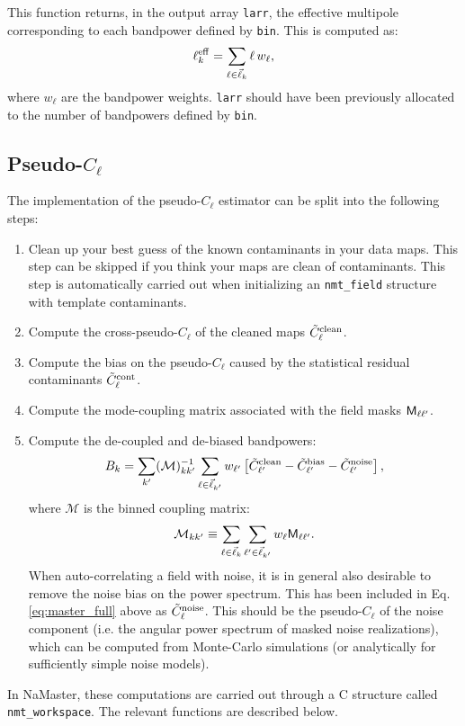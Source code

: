 \documentclass[a4paper,10pt]{article}
\newcommand{\vari}[2]{\textcolor{OliveGreen}{#1}{#2}}
\newcommand{\functi}[3]{{\tt\textcolor{OliveGreen}{#1}
    \textcolor{blue}{#2}(#3)}}
\newenvironment{funcdef}[2][void main(void)]
{\vspace{12pt}\par\noindent{\large{\bf #1}}\vspace{5pt}
 \par\noindent\leftskip=20pt{{#2}}\vspace{5pt}
 \par\noindent\leftskip=5pt\rightskip=5pt}
{\par\leftskip=0pt\rightskip=0pt\vspace{12pt}}
\begin{document}
\begin{funcdef}[nmt\_ell\_eff]
 {\functi{void}{nmt\_ell\_eff}{\vari{nmt\_binning\_scheme *}{bin},\vari{double *}{larr}}}
 This function returns, in the output array {\tt larr}, the effective multipole corresponding to each bandpower defined by {\tt bin}. This is computed as:
 \begin{equation}
   \ell^{\rm eff}_k=\sum_{\ell\in\vec{\ell}_k}\ell\,w_\ell,
 \end{equation}
 where $w_\ell$ are the bandpower weights. {\tt larr} should have been previously allocated to the number of bandpowers defined by {\tt bin}.
\end{funcdef}

\subsection{Pseudo-$C_\ell$}
The implementation of the pseudo-$C_\ell$ estimator can be split into the following steps:
\begin{enumerate}
  \item Clean up your best guess of the known contaminants in your data maps. This step can be skipped if you think your maps are clean of contaminants. This step is automatically carried out when initializing an {\tt nmt\_field} structure with template contaminants.
  \item Compute the cross-pseudo-$C_\ell$ of the cleaned maps $\tilde{C}^{\rm clean}_\ell$.
  \item Compute the bias on the pseudo-$C_\ell$ caused by the statistical residual contaminants $\tilde{C}^{\rm cont}_\ell$.
  \item Compute the mode-coupling matrix associated with the field masks ${\sf M}_{\ell\ell'}$.
  \item Compute the de-coupled and de-biased bandpowers:
        \begin{equation}\label{eq:master_full}
          B_k=\sum_{k'}(\mathcal{M})^{-1}_{kk'}\sum_{\ell\in\vec{\ell}_{k'}}w_{\ell'}\left[\tilde{C}^{\rm clean}_{\ell'}-\tilde{C}^{\rm bias}_{\ell'}-\tilde{C}^{\rm noise}_{\ell'}\right],
        \end{equation}
        where $\mathcal{M}$ is the binned coupling matrix:
        \begin{equation}
          \mathcal{M}_{kk'}\equiv\sum_{\ell\in\vec{\ell}_k}\sum_{\ell'\in\vec{\ell}_{k'}}w_\ell{\sf M}_{\ell\ell'}.
        \end{equation}
        When auto-correlating a field with noise, it is in general also desirable to remove the noise bias on the power spectrum. This has been included in Eq. \ref{eq:master_full} above as $\tilde{C}^{\rm noise}_\ell$. This should be the pseudo-$C_\ell$ of the noise component (i.e. the angular power spectrum of masked noise realizations), which can be computed from Monte-Carlo simulations (or analytically for sufficiently simple noise models).
\end{enumerate}
In NaMaster, these computations are carried out through a C structure called {\tt nmt\_workspace}. The relevant functions are described below.
\end{document}
